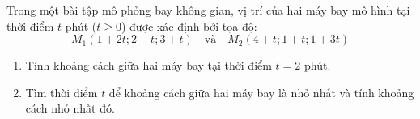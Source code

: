 \exercise Trong một bài tập mô phỏng bay không gian, vị trí của hai máy bay mô hình tại thời điểm $t$ phút ($t \ge 0$) được xác định bởi tọa độ:
$$M_1(1 + 2t; 2 - t; 3 + t) \quad \text{và} \quad M_2(4 + t; 1 + t; 1 + 3t)$$
\begin{enumerate}
    \item Tính khoảng cách giữa hai máy bay tại thời điểm $t = 2$ phút.
    \item Tìm thời điểm $t$ để khoảng cách giữa hai máy bay là nhỏ nhất và tính khoảng cách nhỏ nhất đó.
\end{enumerate}